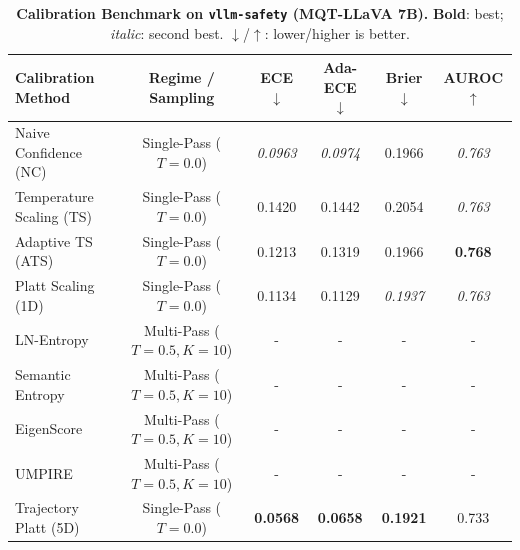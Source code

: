 \begin{table}[t]
\setlength{\tabcolsep}{4pt}
\renewcommand{\arraystretch}{1.05}
\centering
\footnotesize
\begin{tabular}{lccccc}
\toprule
\textbf{Calibration Method} & \textbf{Regime / Sampling} & \textbf{ECE} $\downarrow$ & \textbf{Ada-ECE} $\downarrow$ & \textbf{Brier} $\downarrow$ & \textbf{AUROC} $\uparrow$ \\
\midrule
Naive Confidence (NC) & Single-Pass ($T = 0.0$) & \textit{0.0963} & \textit{0.0974} & 0.1966 & \textit{0.763} \\
Temperature Scaling (TS) & Single-Pass ($T = 0.0$) & 0.1420 & 0.1442 & 0.2054 & \textit{0.763} \\
Adaptive TS (ATS) & Single-Pass ($T = 0.0$) & 0.1213 & 0.1319 & 0.1966 & \textbf{0.768} \\
Platt Scaling (1D) & Single-Pass ($T = 0.0$) & 0.1134 & 0.1129 & \textit{0.1937} & \textit{0.763} \\
LN-Entropy & Multi-Pass ($T = 0.5, K = 10$) & - & - & - & - \\
Semantic Entropy & Multi-Pass ($T = 0.5, K = 10$) & - & - & - & - \\
EigenScore & Multi-Pass ($T = 0.5, K = 10$) & - & - & - & - \\
UMPIRE & Multi-Pass ($T = 0.5, K = 10$) & - & - & - & - \\
Trajectory Platt (5D) & Single-Pass ($T = 0.0$) & \textbf{0.0568} & \textbf{0.0658} & \textbf{0.1921} & 0.733 \\
\bottomrule
\end{tabular}
\caption{\textbf{Calibration Benchmark on \texttt{vllm-safety} (MQT-LLaVA 7B).} \textbf{Bold}: best; \textit{italic}: second best. $\downarrow$/$\uparrow$: lower/higher is better.}
\label{tab:benchmark_mqt_vllmsafety}
\end{table}
